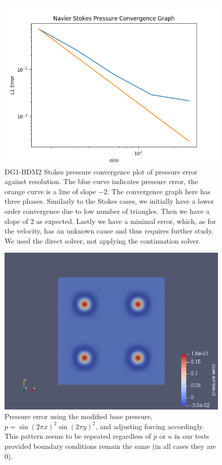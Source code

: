 \documentclass[11pt,twoside,a4paper]{article}
\begin{document}
\begin{figure}
\includegraphics[width=\linewidth]{navier_stokes_pressure_convergence_dbc0.png}
  \caption{DG1-BDM2 Stokes pressure convergence plot of pressure error against resolution. The blue curve indicates pressure error, the orange curve is a line of slope $-2$. The convergence graph here has three phases. Similarly to the Stokes cases, we initially have a lower order convergence due to low number of triangles. Then we have a slope of $2$ as expected. Lastly we have a minimal error, which, as for the velocity, has an unknown cause and thus requires further study. We used the direct solver, not applying the continuation solver.}
\end{figure}

\begin{figure}
  \includegraphics[width=\linewidth]{ns_fail_exp.png}
  \caption{Pressure error using the modified base pressure, $p = \sin(2 \pi x)^2 \sin(2 \pi y)^2$, and adjusting forcing accordingly. This pattern seems to be repeated regardless of $p$ or $u$ in our tests provided boundary conditions remain the same (in all cases they are $0$).}
\end{figure}
\end{document}
